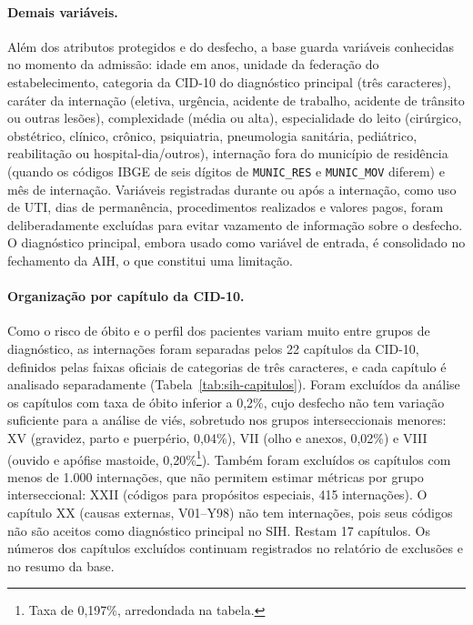 \paragraph{Demais variáveis.}
Além dos atributos protegidos e do desfecho, a base guarda variáveis
conhecidas no momento da admissão: idade em anos, unidade da federação do
estabelecimento, categoria da CID-10 do diagnóstico principal (três
caracteres), caráter da internação (eletiva, urgência, acidente de trabalho,
acidente de trânsito ou outras lesões), complexidade (média ou alta),
especialidade do leito (cirúrgico, obstétrico, clínico, crônico, psiquiatria,
pneumologia sanitária, pediátrico, reabilitação ou hospital-dia/outros),
internação fora do município de residência (quando os códigos IBGE de seis
dígitos de \texttt{MUNIC\_RES} e \texttt{MUNIC\_MOV} diferem) e mês de
internação. Variáveis registradas durante ou após a internação, como uso de
UTI, dias de permanência, procedimentos realizados e valores pagos, foram
deliberadamente excluídas para evitar vazamento de informação sobre o
desfecho. O diagnóstico principal, embora usado como variável de entrada, é
consolidado no fechamento da AIH, o que constitui uma limitação.

\paragraph{Organização por capítulo da CID-10.}
Como o risco de óbito e o perfil dos pacientes variam muito entre grupos de
diagnóstico, as internações foram separadas pelos 22 capítulos da CID-10,
definidos pelas faixas oficiais de categorias de três caracteres, e cada
capítulo é analisado separadamente (Tabela~\ref{tab:sih-capitulos}). Foram
excluídos da análise os capítulos com taxa de óbito inferior a 0,2\%, cujo
desfecho não tem variação suficiente para a análise de viés, sobretudo nos
grupos interseccionais menores: XV (gravidez, parto e puerpério, 0,04\%), VII
(olho e anexos, 0,02\%) e VIII (ouvido e apófise mastoide, 0,20\%\footnote{Taxa
de 0,197\%, arredondada na tabela.}). Também foram excluídos os capítulos com
menos de 1.000 internações, que não permitem estimar métricas por grupo
interseccional: XXII (códigos para propósitos especiais, 415 internações). O
capítulo XX (causas externas, V01--Y98) não tem internações, pois seus códigos
não são aceitos como diagnóstico principal no SIH. Restam 17 capítulos. Os
números dos capítulos excluídos continuam registrados no relatório de
exclusões e no resumo da base.

